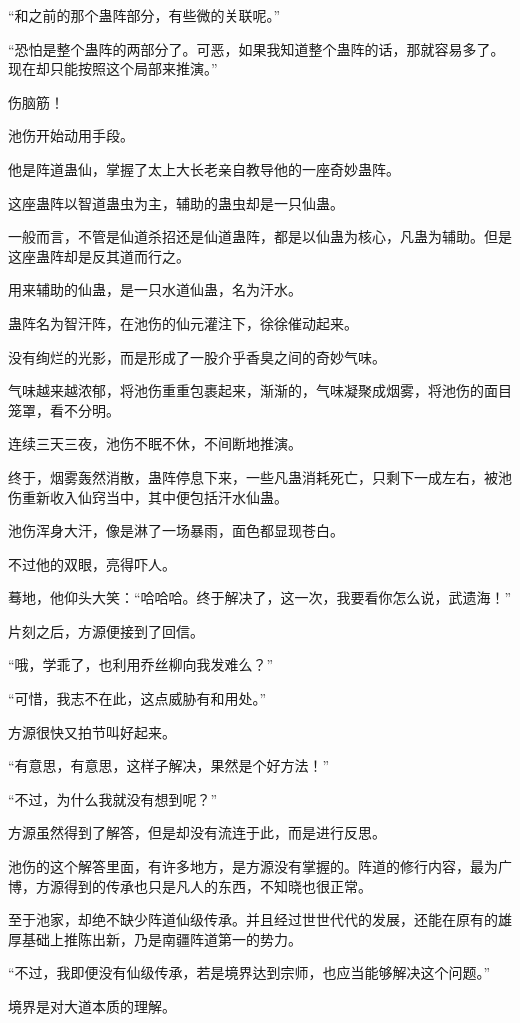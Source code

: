 \begin{this_body}
“和之前的那个蛊阵部分，有些微的关联呢。”

“恐怕是整个蛊阵的两部分了。可恶，如果我知道整个蛊阵的话，那就容易多了。现在却只能按照这个局部来推演。”

伤脑筋！

池伤开始动用手段。

他是阵道蛊仙，掌握了太上大长老亲自教导他的一座奇妙蛊阵。

这座蛊阵以智道蛊虫为主，辅助的蛊虫却是一只仙蛊。

一般而言，不管是仙道杀招还是仙道蛊阵，都是以仙蛊为核心，凡蛊为辅助。但是这座蛊阵却是反其道而行之。

用来辅助的仙蛊，是一只水道仙蛊，名为汗水。

蛊阵名为智汗阵，在池伤的仙元灌注下，徐徐催动起来。

没有绚烂的光影，而是形成了一股介乎香臭之间的奇妙气味。

气味越来越浓郁，将池伤重重包裹起来，渐渐的，气味凝聚成烟雾，将池伤的面目笼罩，看不分明。

连续三天三夜，池伤不眠不休，不间断地推演。

终于，烟雾轰然消散，蛊阵停息下来，一些凡蛊消耗死亡，只剩下一成左右，被池伤重新收入仙窍当中，其中便包括汗水仙蛊。

池伤浑身大汗，像是淋了一场暴雨，面色都显现苍白。

不过他的双眼，亮得吓人。

蓦地，他仰头大笑：“哈哈哈。终于解决了，这一次，我要看你怎么说，武遗海！”

片刻之后，方源便接到了回信。

“哦，学乖了，也利用乔丝柳向我发难么？”

“可惜，我志不在此，这点威胁有和用处。”

方源很快又拍节叫好起来。

“有意思，有意思，这样子解决，果然是个好方法！”

“不过，为什么我就没有想到呢？”

方源虽然得到了解答，但是却没有流连于此，而是进行反思。

池伤的这个解答里面，有许多地方，是方源没有掌握的。阵道的修行内容，最为广博，方源得到的传承也只是凡人的东西，不知晓也很正常。

至于池家，却绝不缺少阵道仙级传承。并且经过世世代代的发展，还能在原有的雄厚基础上推陈出新，乃是南疆阵道第一的势力。

“不过，我即便没有仙级传承，若是境界达到宗师，也应当能够解决这个问题。”

境界是对大道本质的理解。


\end{this_body}
